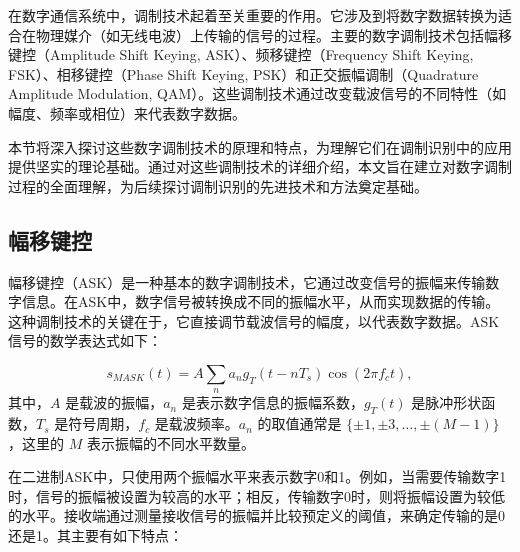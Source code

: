 在数字通信系统中，调制技术起着至关重要的作用。它涉及到将数字数据转换为适合在物理媒介（如无线电波）上传输的信号的过程。主要的数字调制技术包括幅移键控（Amplitude Shift Keying, ASK）、频移键控（Frequency Shift Keying, FSK）、相移键控（Phase Shift Keying, PSK）和正交振幅调制（Quadrature Amplitude Modulation, QAM）。这些调制技术通过改变载波信号的不同特性（如幅度、频率或相位）来代表数字数据。

本节将深入探讨这些数字调制技术的原理和特点，为理解它们在调制识别中的应用提供坚实的理论基础。通过对这些调制技术的详细介绍，本文旨在建立对数字调制过程的全面理解，为后续探讨调制识别的先进技术和方法奠定基础。

\subsection{幅移键控}\label{sec:background}


幅移键控（ASK）是一种基本的数字调制技术，它通过改变信号的振幅来传输数字信息。在ASK中，数字信号被转换成不同的振幅水平，从而实现数据的传输。这种调制技术的关键在于，它直接调节载波信号的幅度，以代表数字数据。ASK信号的数学表达式如下：

\begin{equation}
    s_{MASK}(t) = A \sum_n a_n g_T (t-nT_s) \cos(2\pi f_c t),
\end{equation}
其中，\( A \) 是载波的振幅，\( a_n \) 是表示数字信息的振幅系数，\( g_T(t) \) 是脉冲形状函数，\( T_s \) 是符号周期，\( f_c \) 是载波频率。\( a_n \) 的取值通常是 \(\{\pm 1, \pm 3, \dots, \pm(M-1)\}\)，这里的 \( M \) 表示振幅的不同水平数量。

在二进制ASK中，只使用两个振幅水平来表示数字0和1。例如，当需要传输数字1时，信号的振幅被设置为较高的水平；相反，传输数字0时，则将振幅设置为较低的水平。接收端通过测量接收信号的振幅并比较预定义的阈值，来确定传输的是0还是1。其主要有如下特点：


